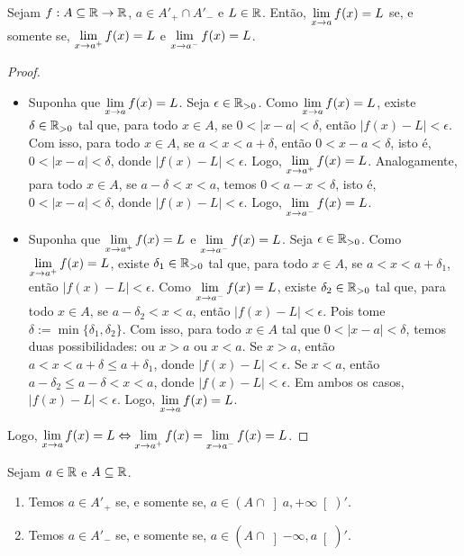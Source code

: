 \begin{theorem} \label{teo.calc1:bilatsselat}
    Sejam $f : A \subseteq \mathbb{R} \to \mathbb{R}$, $a \in A'_+ \cap A'_-$ e $L \in \mathbb{R}$. Então, $\displaystyle \lim_{x \to a} f(x) = L$ se, e somente se, $\displaystyle \lim_{x \to a^+} f(x) = L$ e $\displaystyle \lim_{x \to a^-} f(x) = L$.
\end{theorem}

\begin{proof}
    \leavevmode
        \begin{itemize}[align=left]
            \item[($\Rightarrow$)] Suponha que $\displaystyle \lim_{x \to a} f(x) = L$. Seja $\epsilon \in \mathbb{R}_{>0}$. Como $\displaystyle \lim_{x \to a} f(x) = L$, existe $\delta \in \mathbb{R}_{>0}$ tal que, para todo $x \in A$, se $0<|x-a|<\delta$, então $|f(x)-L| < \epsilon$. Com isso, para todo $x \in A$, se $a < x < a+\delta$, então $0 < x-a < \delta$, isto é, $0 < |x-a| < \delta$, donde $|f(x)-L| < \epsilon$. Logo, $\displaystyle \lim_{x \to a^+} f(x) = L$. Analogamente, para todo $x \in A$, se $a-\delta < x < a$, temos $0 < a-x < \delta$, isto é, $0 < |x-a| < \delta$, donde $|f(x)-L| < \epsilon$. Logo, $\displaystyle \lim_{x \to a^-} f(x) = L$.
            \item[($\Leftarrow$)] Suponha que $\displaystyle \lim_{x \to a^+} f(x) = L$ e $\displaystyle \lim_{x \to a^-} f(x) = L$. Seja $\epsilon \in \mathbb{R}_{>0}$. Como $\displaystyle \lim_{x \to a^+} f(x) = L$, existe $\delta_1 \in \mathbb{R}_{>0}$ tal que, para todo $x \in A$, se $a < x < a+\delta_1$, então $|f(x)-L| < \epsilon$. Como $\displaystyle \lim_{x \to a^-} f(x) = L$, existe $\delta_2 \in \mathbb{R}_{>0}$ tal que, para todo $x \in A$, se $a-\delta_2 < x < a$, então $|f(x)-L| < \epsilon$. Pois tome $\delta := \min\{\delta_1, \delta_2\}$. Com isso, para todo $x \in A$ tal que $0 < |x-a| < \delta$, temos duas possibilidades: ou $x > a$ ou $x < a$. Se $x > a$, então $a < x < a+\delta \leq a+\delta_1$, donde $|f(x)-L| < \epsilon$. Se $x < a$, então $a-\delta_2 \leq a-\delta < x < a$, donde $|f(x)-L| < \epsilon$. Em ambos os casos, $|f(x) - L| < \epsilon$. Logo, $\displaystyle \lim_{x \to a} f(x) = L$.
        \end{itemize}
    Logo, $\displaystyle \lim_{x \to a} f(x) = L \Leftrightarrow \lim_{x \to a^+} f(x) = \lim_{x \to a^-} f(x) = L$. \blackproof
\end{proof}

\begin{proposition}
    Sejam $a \in \mathbb{R}$ e $A \subseteq \mathbb{R}$.
        \begin{enumerate}[leftmargin=*, align=left, label=\textbf{(\alph*)}]
            \item Temos $a \in A'_+$ se, e somente se, $a \in (A \cap \left]a,+\infty \right[)'$.
            \item Temos $a \in A'_-$ se, e somente se, $a \in (A \cap \left]-\infty, a \right[)'$.
        \end{enumerate}
\end{proposition}

